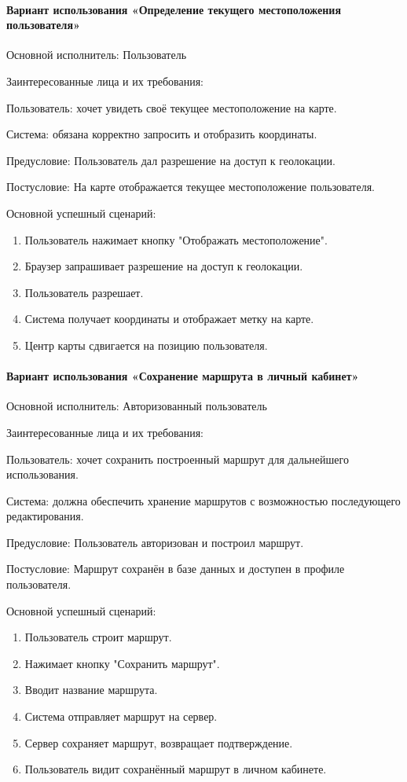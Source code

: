 \paragraph{Вариант использования «Определение текущего местоположения пользователя»}

Основной исполнитель: Пользователь

Заинтересованные лица и их требования:

Пользователь: хочет увидеть своё текущее местоположение на карте.

Система: обязана корректно запросить и отобразить координаты.

Предусловие: Пользователь дал разрешение на доступ к геолокации.

Постусловие: На карте отображается текущее местоположение пользователя.

Основной успешный сценарий:
\begin{enumerate}
	\item Пользователь нажимает кнопку "Отображать местоположение".
	\item Браузер запрашивает разрешение на доступ к геолокации.
	\item Пользователь разрешает.
	\item Система получает координаты и отображает метку на карте.
	\item Центр карты сдвигается на позицию пользователя.
\end{enumerate}

\paragraph{Вариант использования «Сохранение маршрута в личный кабинет»}

Основной исполнитель: Авторизованный пользователь

Заинтересованные лица и их требования:

Пользователь: хочет сохранить построенный маршрут для дальнейшего использования.

Система: должна обеспечить хранение маршрутов с возможностью последующего редактирования.

Предусловие: Пользователь авторизован и построил маршрут.

Постусловие: Маршрут сохранён в базе данных и доступен в профиле пользователя.

Основной успешный сценарий:
\begin{enumerate}
	\item Пользователь строит маршрут.
	\item Нажимает кнопку "Сохранить маршрут".
	\item Вводит название маршрута.
	\item Система отправляет маршрут на сервер.
	\item Сервер сохраняет маршрут, возвращает подтверждение.
	\item Пользователь видит сохранённый маршрут в личном кабинете.
\end{enumerate}

